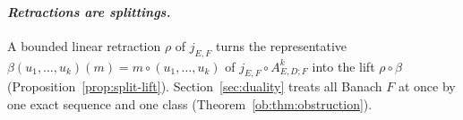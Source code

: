 \paragraph{\textit{Retractions are splittings.}}
A bounded linear retraction $\rho$ of $j_{E,F}$ turns the representative $\beta(u_1,\ldots,u_k)(m)=m\circ(u_1,\ldots,u_k)$ of $j_{E,F}\circ A^k_{E,D;F}$ into the lift $\rho\circ\beta$ (Proposition~\ref{prop:split-lift}). Section~\ref{sec:duality} treats all Banach $F$ at once by one exact sequence and one class (Theorem~\ref{ob:thm:obstruction}).
